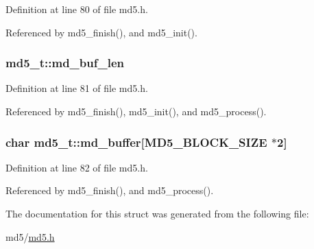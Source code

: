 Definition at line 80 of file md5.h.

Referenced by md5\_\-finish(), and md5\_\-init().\hypertarget{structmd5__t_7bf7169ebc0df8192cd2c322b956d81b}{
\subsubsection[md\_\-buf\_\-len]{ {\bf md5\_\-t::md\_\-buf\_\-len}}}
\label{structmd5__t_7bf7169ebc0df8192cd2c322b956d81b}




Definition at line 81 of file md5.h.

Referenced by md5\_\-finish(), md5\_\-init(), and md5\_\-process().\hypertarget{structmd5__t_ce5d5c1497a2793065a7abf0d8bccde9}{
\subsubsection[md\_\-buffer]{\setlength{\rightskip}{0pt plus 5cm}char {\bf md5\_\-t::md\_\-buffer}\mbox{[}MD5\_\-BLOCK\_\-SIZE $\ast$2\mbox{]}}}
\label{structmd5__t_ce5d5c1497a2793065a7abf0d8bccde9}




Definition at line 82 of file md5.h.

Referenced by md5\_\-finish(), and md5\_\-process().

The documentation for this struct was generated from the following file:\begin{CompactItemize}
\item 
md5/\hyperlink{md5_8h}{md5.h}\end{CompactItemize}
